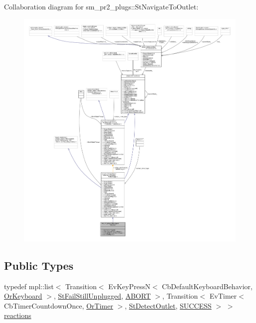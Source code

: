 Collaboration diagram for sm\+\_\+pr2\+\_\+plugs\+:\+:St\+Navigate\+To\+Outlet\+:
\nopagebreak
\begin{figure}[H]
\begin{center}
\leavevmode
\includegraphics[width=350pt]{structsm__pr2__plugs_1_1StNavigateToOutlet__coll__graph}
\end{center}
\end{figure}
\subsection*{Public Types}
\begin{DoxyCompactItemize}
\item 
typedef mpl\+::list$<$ Transition$<$ Ev\+Key\+PressN$<$ Cb\+Default\+Keyboard\+Behavior, \hyperlink{classsm__pr2__plugs_1_1OrKeyboard}{Or\+Keyboard} $>$, \hyperlink{structsm__pr2__plugs_1_1StFailStillUnplugged}{St\+Fail\+Still\+Unplugged}, \hyperlink{classABORT}{A\+B\+O\+RT} $>$, Transition$<$ Ev\+Timer$<$ Cb\+Timer\+Countdown\+Once, \hyperlink{classsm__pr2__plugs_1_1OrTimer}{Or\+Timer} $>$, \hyperlink{structsm__pr2__plugs_1_1StDetectOutlet}{St\+Detect\+Outlet}, \hyperlink{classSUCCESS}{S\+U\+C\+C\+E\+SS} $>$ $>$ \hyperlink{structsm__pr2__plugs_1_1StNavigateToOutlet_a4b5b4d30a2a64c438e9a4d89016fc052}{reactions}
\end{DoxyCompactItemize}
